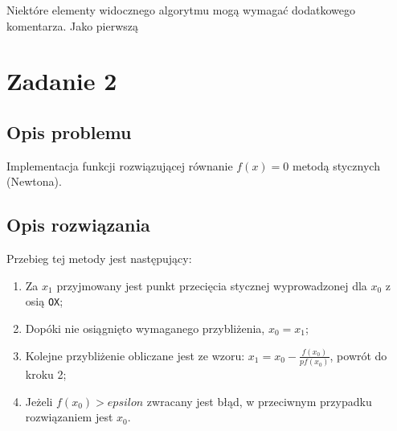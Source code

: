 \documentclass{classrep}
\begin{document}
		Niektóre elementy widocznego algorytmu mogą wymagać dodatkowego komentarza. Jako pierwszą
	
\section{Zadanie 2}
	\subsection{Opis problemu}
		Implementacja funkcji rozwiązującej równanie $f(x)=0$ metodą stycznych (Newtona).
		
	\subsection{Opis rozwiązania}	
		Przebieg tej metody jest następujący:
		\begin{enumerate}
			\item Za $x_1$ przyjmowany jest punkt przecięcia stycznej wyprowadzonej dla $x_0$ z osią \texttt{OX};
			\item Dopóki nie osiągnięto wymaganego przybliżenia, $x_0 = x_1$;
			\item Kolejne przybliżenie obliczane jest ze wzoru: $x_1 = x_0-\frac{f(x_0)}{pf(x_0)}$, powrót do kroku 2;
			\item Jeżeli $f(x_0)>epsilon$ zwracany jest błąd, w przeciwnym przypadku rozwiązaniem jest $x_0$.
		\end{enumerate}	
	
\end{document}
